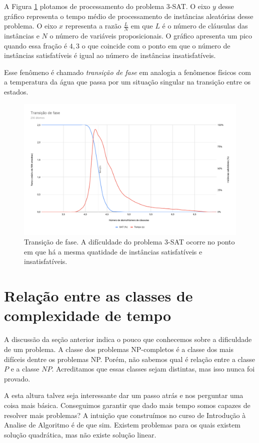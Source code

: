 A Figura \ref{fig:phase-transition} plotamos de processamento do problema 3-SAT.
O eixo $y$ desse gráfico representa o tempo médio de processamento de instâncias aleatórias desse problema.
O eixo $x$ representa a razão $\frac{L}{N}$ em que $L$ é o número de cláusulas das instâncias e $N$ o número de variáveis proposicionais.
O gráfico apresenta um pico quando essa fração é $4,3$ o que coincide com o ponto em que o número de instâncias satisfatíveis é igual ao número de instâncias insatisfatíveis.

Esse fenômeno é chamado {\em transição de fase} em analogia a fenômenos físicos com a temperatura da água que passa por um situação singular na transição entre os estados.

\begin{figure}
  \label{fig:phase-transition}
  \includegraphics[width=\textwidth]{phase-transition.png}
  \caption{Transição de fase. A difículdade do problema 3-SAT ocorre no ponto em que há a mesma quatidade de instâncias satisfatíveis e insatisfatíveis.}
\end{figure}


\section{Relação entre as classes de complexidade de tempo}
\label{sec:hierarquia}

A discussão da seção anterior indica o pouco que conhecemos sobre a dificuldade de um problema.
A classe dos problemas NP-completos é a classe dos mais difíceis dentre os problemas NP.
Porém, não sabemos qual é relação entre a classe $P$ e a classe $NP$.
Acreditamos que essas classes sejam distintas, mas isso nunca foi provado.

A esta altura talvez seja interessante dar um passo atrás e nos perguntar uma coisa mais básica.
Conseguimos garantir que dado mais tempo somos capazes de resolver mais problemas?
A intuição que construímos no curso de Introdução à Analise de Algoritmo é de que sim.
Existem problemas para os quais existem solução quadrática, mas não existe solução linear.

